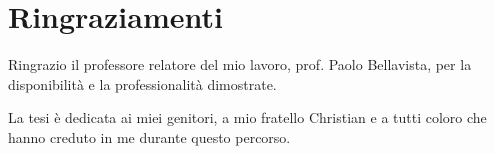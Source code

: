\chapter*{Ringraziamenti}
Ringrazio il professore relatore del mio lavoro, prof. Paolo Bellavista, per la disponibilità e la professionalità dimostrate.

La tesi è dedicata ai miei genitori, a mio fratello Christian e a tutti coloro che hanno creduto in me durante questo percorso.